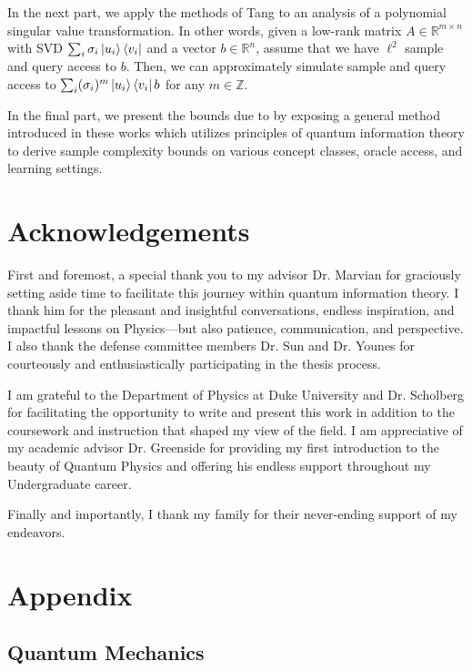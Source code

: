 \documentclass{book}
\newcommand\0{\mathbf{0}}
\newcommand\RR{\mathbb{R}}
\newcommand\ZZ{\mathbb{Z}}
\newcommand\<{\langle}
\renewcommand\>{\rangle}
\begin{document}
In the next part, we apply the methods of Tang to an analysis of a polynomial singular value transformation. In other words, given a low-rank matrix $A \in \RR^{m\times n}$ with SVD $\sum_i \sigma_i \ket{u_i} \bra{v_i}$ and a vector $b \in \RR^n$, assume that we have $\ell^2$ sample and query access to $b$. Then, we can approximately simulate sample and query access to $\sum_i (\sigma_i)^m \ket{u_i} \bra{v_i} b$ for any $m \in \ZZ$.

In the final part, we present the bounds due to \cite{arunachalam2016optimal, arunachalam2018two} by exposing a general method introduced in these works which utilizes principles of quantum information theory to derive sample complexity bounds on various concept classes, oracle access, and learning settings.

%



\chapter{Acknowledgements} 

First and foremost, a special thank you to my advisor Dr. Marvian for graciously setting aside time to facilitate this journey within quantum information theory. I thank him for the pleasant and insightful conversations, endless inspiration, and impactful lessons on Physics---but also patience, communication, and perspective. I also thank the defense committee members Dr. Sun and Dr. Younes for courteously and enthusiastically participating in the thesis process.

I am grateful to the Department of Physics at Duke University and Dr. Scholberg for facilitating the opportunity to write and present this work in addition to the coursework and instruction that shaped my view of the field. I am appreciative of my academic advisor Dr. Greenside for providing my first introduction to the beauty of Quantum Physics and offering his endless support throughout my Undergraduate career.

Finally and importantly, I thank my family for their never-ending support of my endeavors. 

\appendix
\chapter{Appendix}

\section{Quantum Mechanics}
\end{document}
